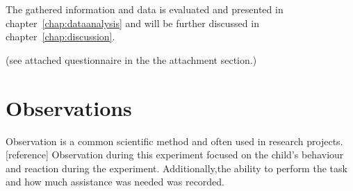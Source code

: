 The gathered information and data is evaluated and presented in chapter~\ref{chap:dataanalysis} and will be further discussed in chapter~\ref{chap:discussion}.

(see attached questionnaire in the the attachment section.)



\section{Observations}

Observation is a common scientific method and often used in research projects.[reference] 
Observation during this experiment focused on the child's behaviour and reaction during the experiment. Additionally,the ability to perform the task and how much assistance was needed was recorded.
